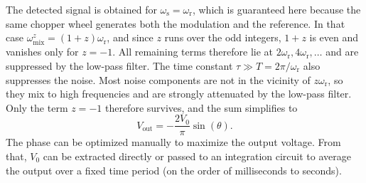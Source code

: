 The detected signal is obtained for $\omega_{\mathrm{s}}=\omega_{\mathrm{r}}$,
which is guaranteed here because the same chopper wheel generates both the
modulation and the reference. In that case $\omega_{\mathrm{mix}}^{z}=(1+z)\omega
_{\mathrm{r}}$, and since $z$ runs over the odd integers, $1+z$ is even and vanishes
only for $z=-1$. All remaining terms therefore lie at
$2\omega_{\mathrm{r}}, 4\omega_{\mathrm{r}}, \dots$ and are suppressed by the
low-pass filter. The time constant $\tau \gg T=2 \pi / \omega_{\mathrm{r}}$ also suppresses
the noise. Most noise components are not in the vicinity of
$z \omega_{\mathrm{r}}$, so they mix to high frequencies and are strongly attenuated
by the low-pass filter. Only the term $z= -1$ therefore survives, and the sum simplifies
to
\begin{equation}
	V_{\mathrm{out}}=-\frac{2V_{0}}{\pi}\sin(\theta). \label{eq:lock_in_result}
\end{equation}
The phase can be optimized manually to maximize the output voltage. From that, $V
_{0}$ can be extracted directly or passed to an integration circuit to average the
output over a fixed time period (on the order of milliseconds to seconds).